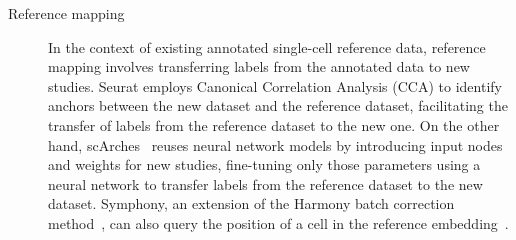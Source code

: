 \begin{description}
	\item[Reference mapping]
	In the context of existing annotated single-cell reference data, reference mapping involves transferring labels from the annotated data to new studies. Seurat employs Canonical Correlation Analysis (CCA) to identify anchors between the new dataset and the reference dataset, facilitating the transfer of labels from the reference dataset to the new one. On the other hand, scArches~\citep{lotfollahi2022scarches} reuses neural network models by introducing input nodes and weights for new studies, fine-tuning only those parameters using a neural network to transfer labels from the reference dataset to the new dataset. Symphony, an extension of the Harmony batch correction method~\citep{korsunsky2019harmony}, can also query the position of a cell in the reference embedding~\citep{kang2021symphony}.

\end{description}

